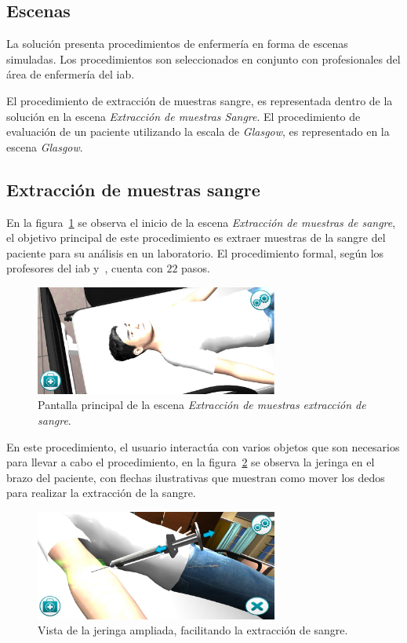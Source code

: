 \subsection{Escenas}

La solución presenta procedimientos de enfermería en forma de escenas simuladas.
Los procedimientos son seleccionados en conjunto con profesionales del área de
enfermería del \gls{iab}. 

El procedimiento de extracción de muestras sangre, es representada dentro de la
solución en la escena \emph{Extracción de muestras Sangre}. El procedimiento de
evaluación de un paciente utilizando la escala de \textit{Glasgow}, es
representado en la escena \emph{Glasgow}.

\subsection{Extracción de muestras sangre}

En la figura~\ref{fig:hemocultivo_principal} se observa el inicio de la escena
\emph{Extracción de muestras de sangre}, el objetivo principal de este
procedimiento es extraer muestras de la sangre del paciente para su análisis en
un laboratorio. El procedimiento formal, según los profesores del
\gls{iab} y~\cite{oms:extraccion}, cuenta con $22$ pasos.

\begin{figure}[H] 
\centering 
\includegraphics[width=8cm]{../solucion/images/hemocultivo_principal.jpg}
\caption{Pantalla principal de la escena \emph{Extracción de muestras extracción
        de sangre}.}
\label{fig:hemocultivo_principal}
\end{figure}

En este procedimiento, el usuario interactúa con varios objetos que son
necesarios para llevar a cabo el procedimiento, en la
figura~\ref{fig:hemocultivo_jeringa_zoom} se observa la jeringa en el brazo del
paciente, con flechas ilustrativas que muestran como mover los dedos para
realizar la extracción de la sangre.

\begin{figure}[H]
\centering 
\includegraphics[width=8cm]{../solucion/images/hemocultivo_jeringa_ampliada.jpg}
\caption{Vista de la jeringa ampliada, facilitando la extracción de sangre.}
\label{fig:hemocultivo_jeringa_zoom}
\end{figure}

